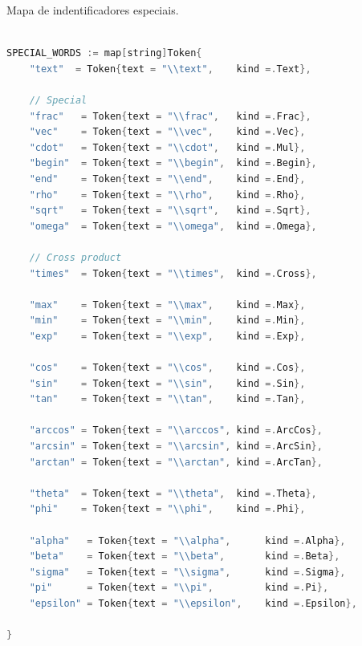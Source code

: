 \begin{codigo}[htb]
        \caption{\small Mapa de indentificadores especiais. }
        \label{map-special-identifiers}
  \begin{lstlisting}[language=C++]

SPECIAL_WORDS := map[string]Token{
    "text"  = Token{text = "\\text",    kind =.Text},

    // Special
    "frac"   = Token{text = "\\frac",   kind =.Frac},
    "vec"    = Token{text = "\\vec",    kind =.Vec},
    "cdot"   = Token{text = "\\cdot",   kind =.Mul},
    "begin"  = Token{text = "\\begin",  kind =.Begin},
    "end"    = Token{text = "\\end",    kind =.End},
    "rho"    = Token{text = "\\rho",    kind =.Rho},
    "sqrt"   = Token{text = "\\sqrt",   kind =.Sqrt},
    "omega"  = Token{text = "\\omega",  kind =.Omega},

    // Cross product
    "times"  = Token{text = "\\times",  kind =.Cross},

    "max"    = Token{text = "\\max",    kind =.Max},
    "min"    = Token{text = "\\min",    kind =.Min},
    "exp"    = Token{text = "\\exp",    kind =.Exp},

    "cos"    = Token{text = "\\cos",    kind =.Cos},
    "sin"    = Token{text = "\\sin",    kind =.Sin},
    "tan"    = Token{text = "\\tan",    kind =.Tan},

    "arccos" = Token{text = "\\arccos", kind =.ArcCos},
    "arcsin" = Token{text = "\\arcsin", kind =.ArcSin},
    "arctan" = Token{text = "\\arctan", kind =.ArcTan},

    "theta"  = Token{text = "\\theta",  kind =.Theta},
    "phi"    = Token{text = "\\phi",    kind =.Phi},

    "alpha"   = Token{text = "\\alpha",      kind =.Alpha},
    "beta"    = Token{text = "\\beta",       kind =.Beta},
    "sigma"   = Token{text = "\\sigma",      kind =.Sigma},
    "pi"      = Token{text = "\\pi",         kind =.Pi},
    "epsilon" = Token{text = "\\epsilon",    kind =.Epsilon},

}

    
  \end{lstlisting}
\end{codigo}


